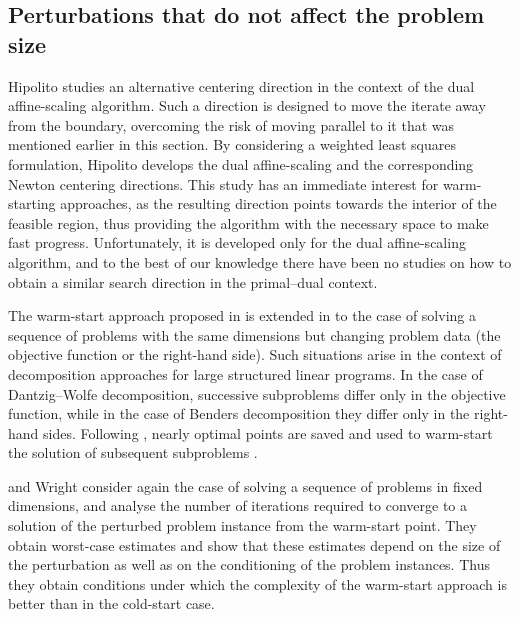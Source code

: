 %
%
\subsection{Perturbations that do not affect the problem size}

Hipolito \cite{Hipolito} studies an alternative centering direction 
in the context of the dual affine-scaling algorithm. Such a 
direction is designed to move the iterate away from the boundary, 
overcoming the risk of moving parallel to it that was mentioned 
earlier in this section.
By considering a weighted least squares formulation, Hipolito 
develops the dual affine-scaling and the corresponding Newton 
centering directions. 
This study has an immediate interest for warm-starting approaches,
as the resulting direction points towards the interior of the 
feasible region, thus providing the algorithm with the necessary 
space to make fast progress. 
Unfortunately, it is developed only for the dual affine-scaling 
algorithm, and to the best of our knowledge there have been no 
studies on how to obtain a similar search direction in the 
primal--dual context.

The warm-start approach proposed in \cite{Gondzio98} is extended
in \cite{GondzioVial} to the case of solving a sequence of problems 
with the same dimensions but changing problem data (the objective 
function or the right-hand side). Such situations arise 
in the context of decomposition approaches for large structured 
linear programs. 
In the case of Dantzig--Wolfe decomposition, successive subproblems 
differ only in the objective function, while in the case 
of Benders decomposition they differ only in the right-hand sides.
Following \cite{Gondzio98}, nearly optimal points are saved and used 
to warm-start the solution of subsequent subproblems \cite{GondzioVial}.


\yildirim and Wright \cite{YildirimWright} consider again the case 
of solving a sequence of problems in fixed dimensions, and
analyse the number of iterations required to converge to a 
solution of the perturbed problem instance from the warm-start point.
They obtain worst-case estimates and
show that these estimates depend on the size of the perturbation 
as well as on the conditioning of the problem 
instances. Thus they obtain conditions under which the complexity 
of the warm-start approach is better than in the cold-start case.

